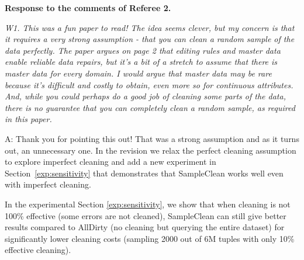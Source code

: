 \vspace{1em}


{\noindent \bf Response to the comments of Referee 2.}

\vspace{1em}

\emph{W1. This was a fun paper to read! The idea seems clever, but my concern is that it requires a very strong assumption - that you can clean a random sample of the data perfectly. The paper argues on page 2 that editing rules and master data enable reliable data repairs, but it's a bit of a stretch to assume that there is master data for every domain. I would argue that master data may be rare because it's difficult and costly to obtain, even more so for continuous attributes. And, while you could perhaps do a good job of cleaning some parts of the data, there is no guarantee that you can completely clean a random sample, as required in this paper.}




A: Thank you for pointing this out!  That was a strong assumption and as it turns out, an unnecessary one.  In the revision we relax the perfect cleaning assumption to explore imperfect cleaning and add a new experiment in Section~\ref{exp:sensitivity} that demonstrates that SampleClean works well even with imperfect cleaning.

In the experimental Section \ref{exp:sensitivity}, we show that when cleaning is not 100\% effective (some errors are not cleaned), SampleClean can still give better results compared to AllDirty (no cleaning but querying the entire dataset) for significantly lower cleaning costs (sampling 2000 out of 6M tuples with only 10\% effective cleaning).

